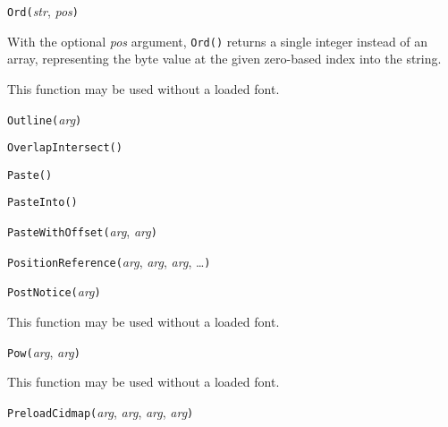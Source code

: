 \texttt{Ord(}\textit{str}, \textit{pos}\texttt{)}

With the optional \textit{pos} argument, \texttt{Ord()} returns a single
integer instead of an array, representing the byte value at the given
zero-based index into the string.

This function may be used without a loaded font.



\texttt{Outline(}\textit{arg}\texttt{)}



\texttt{OverlapIntersect(}\texttt{)}



\texttt{Paste(}\texttt{)}



\texttt{PasteInto(}\texttt{)}



\texttt{PasteWithOffset(}\textit{arg}, \textit{arg}\texttt{)}



\texttt{PositionReference(}\textit{arg}, \textit{arg}, \textit{arg}, \ldots\texttt{)}



\texttt{PostNotice(}\textit{arg}\texttt{)}

This function may be used without a loaded font.



\texttt{Pow(}\textit{arg}, \textit{arg}\texttt{)}

This function may be used without a loaded font.



\texttt{PreloadCidmap(}\textit{arg}, \textit{arg}, \textit{arg}, \textit{arg}\texttt{)}

